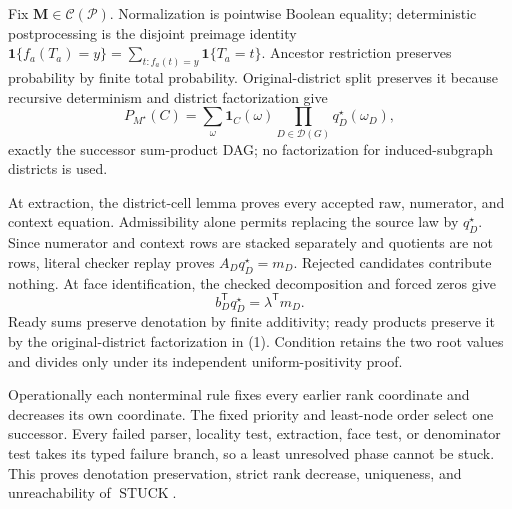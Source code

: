 Fix \(\mathbf M\in\mathcal C(\mathcal P)\).  Normalization is pointwise Boolean equality; deterministic postprocessing is the disjoint preimage identity \(\mathbf1\{f_a(T_a)=y\}=\sum_{t:f_a(t)=y}\mathbf1\{T_a=t\}\).  Ancestor restriction preserves probability by finite total probability.  Original-district split preserves it because recursive determinism and district factorization give
\[
P_{M^\star}(C)=
\sum_{\omega}\mathbf1_C(\omega)
\prod_{D\in\mathcal D(G)}q_D^\star(\omega_D),
\tag{1}
\]
exactly the successor sum-product DAG; no factorization for induced-subgraph districts is used.

At extraction, the district-cell lemma proves every accepted raw, numerator, and context equation.  Admissibility alone permits replacing the source law by \(q_D^\star\).  Since numerator and context rows are stacked separately and quotients are not rows, literal checker replay proves \(A_Dq_D^\star=m_D\).  Rejected candidates contribute nothing.  At face identification, the checked decomposition and forced zeros give
\[
b_D^{\mathsf T}q_D^\star=\lambda^{\mathsf T}m_D.
\tag{2}
\]
Ready sums preserve denotation by finite additivity; ready products preserve it by the original-district factorization in (1).  Condition retains the two root values and divides only under its independent uniform-positivity proof.

Operationally each nonterminal rule fixes every earlier rank coordinate and decreases its own coordinate.  The fixed priority and least-node order select one successor.  Every failed parser, locality test, extraction, face test, or denominator test takes its typed failure branch, so a least unresolved phase cannot be stuck.  This proves denotation preservation, strict rank decrease, uniqueness, and unreachability of \(\operatorname{STUCK}\).